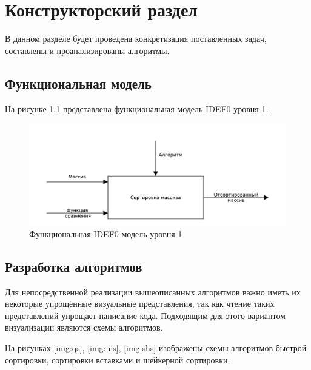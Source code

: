 \chapter{Конструкторский раздел}
\label{cha:design}

В данном разделе будет проведена конкретизация поставленных задач, составлены и проанализированы алгоритмы.

\section{Функциональная модель}
На рисунке \ref{img:IDEF0} представлена функциональная модель IDEF0 уровня 1.
\begin{figure}
    \centering
    \includegraphics[scale=0.75]{./pdf/mainIdef0.pdf}
    \caption{Функциональная IDEF0 модель уровня 1}
    \label{img:IDEF0}
\end{figure}

\section{Разработка алгоритмов}
Для непосредственной реализации вышеописанных алгоритмов важно иметь их некоторые упрощённые визуальные представления, так как чтение таких представлений упрощает написание кода. Подходящим для этого вариантом визуализации являются схемы алгоритмов.

На рисунках \ref{img:qs}, \ref{img:ins}, \ref{img:shs} изображены схемы алгоритмов быстрой сортировки, сортировки вставками и шейкерной сортировки.


